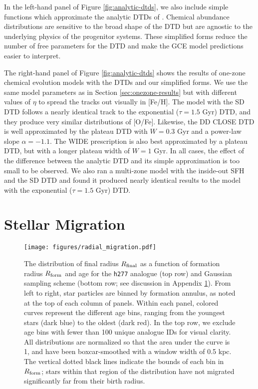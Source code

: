 \documentclass[twocolumn,twocolappendix]{aastex631}
\newcommand{\hydro}{{\tt h277}\xspace}
\begin{document}
In the left-hand panel of Figure \ref{fig:analytic-dtds}, we also include simple functions which approximate the analytic DTDs of \citet{Greggio2005-AnalyticalRates}. Chemical abundance distributions are sensitive to the broad shape of the DTD but are agnostic to the underlying physics of the progenitor systems. These simplified forms reduce the number of free parameters for the DTD and make the GCE model predictions easier to interpret.

The right-hand panel of Figure \ref{fig:analytic-dtds} shows the results of one-zone chemical evolution models with the \citet{Greggio2005-AnalyticalRates} DTDs and our simplified forms. We use the same model parameters as in Section \ref{sec:onezone-results} but with different values of $\eta$ to spread the tracks out visually in [Fe/H]. The model with the SD DTD follows a nearly identical track to the exponential ($\tau=1.5$ Gyr) DTD, and they produce very similar distributions of [O/Fe]. Likewise, the DD CLOSE DTD is well approximated by the plateau DTD with $W=0.3$ Gyr and a power-law slope $\alpha=-1.1$. The WIDE prescription is also best approximated by a plateau DTD, but with a longer plateau width of $W=1$ Gyr. In all cases, the effect of the difference between the analytic DTD and its simple approximation is too small to be observed. We also ran a multi-zone model with the inside-out SFH and the \citet{Greggio2005-AnalyticalRates} SD DTD and found it produced nearly identical results to the model with the exponential ($\tau=1.5$ Gyr) DTD.

\section{Stellar Migration}
\label{app:migration}

\begin{figure*}
    \centering
    \texttt{[image: figures/radial\_migration.pdf]}
    \caption{The distribution of final radius $R_{\rm final}$ as a function of formation radius $R_{\rm form}$ and age for the \hydro analogue (top row) and Gaussian sampling scheme (bottom row; see discussion in Appendix \ref{app:migration}). From left to right, star particles are binned by formation annulus, as noted at the top of each column of panels. Within each panel, colored curves represent the different age bins, ranging from the youngest stars (dark blue) to the oldest (dark red). In the top row, we exclude age bins with fewer than 100 unique analogue IDs for visual clarity. All distributions are normalized so that the area under the curve is 1, and have been boxcar-smoothed with a window width of 0.5 kpc. The vertical dotted black lines indicate the bounds of each bin in $R_{\rm form}$; stars within that region of the distribution have not migrated significantly far from their birth radius.}
    \label{fig:radial-migration}
\end{figure*}
\end{document}
